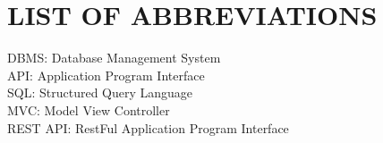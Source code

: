 \chapter*{LIST OF ABBREVIATIONS}

DBMS\hspace{11mm}: Database Management System\\
API\hspace{16mm}: Application Program Interface\\
SQL\hspace{15mm}: Structured Query Language\\
MVC\hspace{13.1mm}: Model View Controller\\
REST API\hspace{3mm}: RestFul Application Program Interface\\


